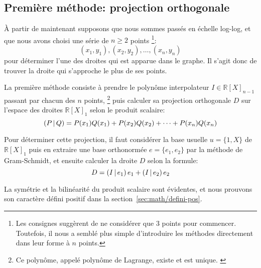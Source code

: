 \subsection{Première méthode: projection orthogonale}

À partir de maintenant supposons que nous sommes passés en échelle log-log,
et que nous avons choisi une série de $n\geq 2$ points%
\footnote{
    Les consignes suggèrent de ne considérer que 3 points pour commencer.
    Toutefois, il nous a semblé plus simple d'introduire les méthodes
    directement dans leur forme à $n$ points.
}:
\[
    (x_1,y_1),(x_2,y_2),\ldots,(x_n,y_n)
\]
pour déterminer l'une des droites qui est apparue dans le graphe.
Il s'agit donc de trouver la droite qui s'approche le plus de ses points.

La première méthode consiste à prendre le polynôme interpolateur
$I \in \mathbb{R}[X]_{n-1}$ passant par chacun des $n$ points,%
\footnote{
    Ce polynôme, appelé polynôme de Lagrange, existe et est unique.%
    \cite{lagrange-poly}
}
puis calculer sa projection orthogonale $D$
sur l'espace des droites $\mathbb{R}[X]_1$
selon le produit scalaire:
\begin{equation}
    \left(P\,\middle|\,Q\right) = P(x_1)Q(x_1) + P(x_2)Q(x_2) + \cdots + P(x_n)Q(x_n)
\end{equation}

Pour déterminer cette projection, il faut considérer la base usuelle
$u=\{1,X\}$ de $\mathbb{R}[X]_1$
puis en extraire une base orthonormée $e=\{e_1,e_2\}$ par la méthode
de Gram-Schmidt, et ensuite calculer la droite $D$
selon la formule:
\begin{equation}
    \label{eq:proj-ortho-I}
    D = \left(I\,\middle|\,e_1\right)e_1 + \left(I\,\middle|\,e_2\right)e_2
\end{equation}

La symétrie et la bilinéarité du produit scalaire sont évidentes,
et nous prouvons son caractère défini positif dans
la section~\ref{sec:math/defini-pos}.
